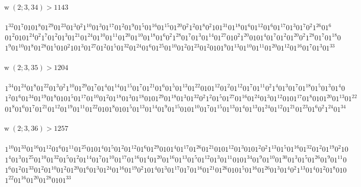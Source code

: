 \documentclass[final,3p,times]{elsarticle}
\theoremstyle{definition}
\DeclareMathOperator{\vdw}{w}
\begin{document}
\begin{appendix}
\paragraph{$\vdw(2; 3, 34) > 1143$}

\begin{gather*}
  1^{32}01^{7}0101^{8}01^{29}01^{23}01^{3}0^{2}1^{10}01^{3}01^{17}01^{2}01^{9}01^{5}01^{16}01^{15}01^{20}0^{2}1^{2}01^{8}0^{2}101^{31}01^{18}01^{6}01^{12}01^{6}01^{17}01^{3}01^{7}0^{2}1^{26}01^{6}\\
  01^{2}0101^{24}0^{2}1^{7}01^{2}01^{3}01^{21}01^{24}01^{10}01^{11}01^{20}01^{10}01^{18}01^{6}0^{2}1^{28}01^{7}01^{3}01^{14}01^{27}010^{2}1^{20}0101^{4}01^{7}01^{2}01^{20}0^{2}1^{28}01^{7}01^{18}0\\
  1^{9}01^{10}01^{8}01^{28}01^{5}010^{2}101^{3}01^{27}01^{2}01^{5}01^{32}01^{24}01^{6}01^{25}01^{10}01^{2}01^{23}01^{2}0101^{9}01^{13}01^{10}01^{11}01^{20}01^{12}01^{16}01^{7}01^{3}01^{33}
\end{gather*}


\paragraph{$\vdw(2; 3, 35) > 1204$}

\begin{gather*}
  1^{34}01^{24}01^{8}01^{22}01^{3}0^{2}1^{10}01^{29}01^{7}01^{4}01^{14}01^{15}01^{7}01^{21}01^{6}01^{5}01^{13}01^{22}0101^{12}01^{2}01^{12}01^{7}01^{11}0^{2}1^{4}01^{3}01^{7}01^{18}01^{5}01^{3}01^{4}0\\
  1^{2}01^{6}01^{34}01^{19}01^{8}0101^{5}01^{17}01^{10}01^{2}01^{18}01^{3}01^{18}0101^{29}01^{18}01^{3}01^{32}0^{2}1^{2}01^{5}01^{27}01^{16}01^{24}01^{3}01^{12}0101^{17}01^{8}0101^{20}01^{13}01^{22}\\
  01^{8}01^{6}01^{7}01^{21}01^{12}01^{19}01^{11}01^{22}0101^{8}0101^{5}01^{13}01^{14}01^{9}01^{15}0101^{10}01^{7}01^{15}01^{13}01^{4}01^{13}01^{24}01^{12}01^{21}01^{23}01^{6}0^{2}1^{24}01^{34}
\end{gather*}


\paragraph{$\vdw(2; 3, 36) > 1257$}

\begin{gather*}
  1^{10}01^{33}01^{16}01^{12}01^{6}01^{11}01^{25}0101^{4}01^{5}01^{2}01^{12}01^{6}01^{29}0101^{4}01^{17}01^{26}01^{21}0101^{12}01^{3}0101^{2}0^{2}1^{13}01^{5}01^{16}01^{32}01^{2}01^{19}0^{2}10\\
  1^{4}01^{3}01^{25}01^{10}01^{32}01^{5}01^{2}01^{14}01^{7}01^{10}01^{17}01^{16}01^{4}01^{20}01^{16}01^{13}01^{5}01^{12}01^{3}01^{11}0101^{34}01^{9}01^{10}01^{30}01^{3}01^{5}01^{26}01^{9}01^{11}0\\
  1^{6}01^{2}01^{33}01^{2}01^{10}01^{2}01^{20}01^{6}01^{3}01^{24}01^{16}01^{19}0^{2}101^{4}01^{3}01^{17}01^{7}01^{16}01^{21}01^{26}0101^{5}01^{16}01^{26}01^{3}01^{4}0^{2}1^{13}01^{4}01^{2}01^{8}010\\
  1^{22}01^{16}01^{20}01^{28}0101^{33}
\end{gather*}



\end{appendix}
\end{document}
